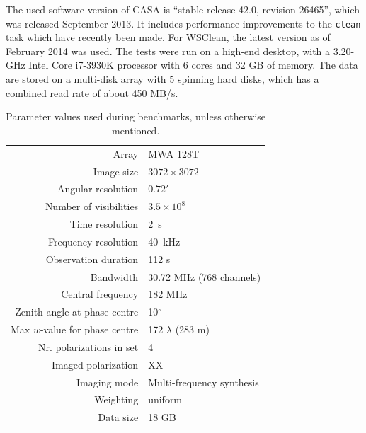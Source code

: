 \documentclass[useAMS,usenatbib]{mn2e}
\newcommand{\degree}{\ensuremath{^{\circ}}\xspace}
\begin{document}
The used software version of CASA is ``stable release 42.0, revision 26465'', which was released September 2013. It includes performance improvements to the \texttt{clean} task which have recently been made. For WSClean, the latest version as of February 2014 was used. The tests were run on a high-end desktop, with a 3.20-GHz Intel Core i7-3930K processor with 6 cores and 32 GB of memory. The data are stored on a multi-disk array with 5 spinning hard disks, which has a combined read rate of about 450 MB/s.
\begin{table}%
\caption{Parameter values used during benchmarks, unless otherwise mentioned.} \label{tbl:default-parameters}%
\begin{center}\begin{tabular}{rl}%
\hline
Array & MWA 128T \\
Image size & $3072 \times 3072$ \\
Angular resolution & $0.72'$ \\
Number of visibilities & $3.5 \times 10^8$ \\
Time resolution & 2~s \\
Frequency resolution & 40~kHz \\
Observation duration & 112 s\\
Bandwidth & 30.72 MHz (768 channels)\\
Central frequency & 182 MHz \\
Zenith angle at phase centre & 10\degree \\
Max $w$-value for phase centre & 172 $\lambda$ (283 m) \\
Nr. polarizations in set & 4 \\
Imaged polarization & XX \\
Imaging mode & Multi-frequency synthesis \\
Weighting & uniform \\
Data size & 18 GB \\
\hline
\end{tabular}\end{center}\end{table}
\end{document}
